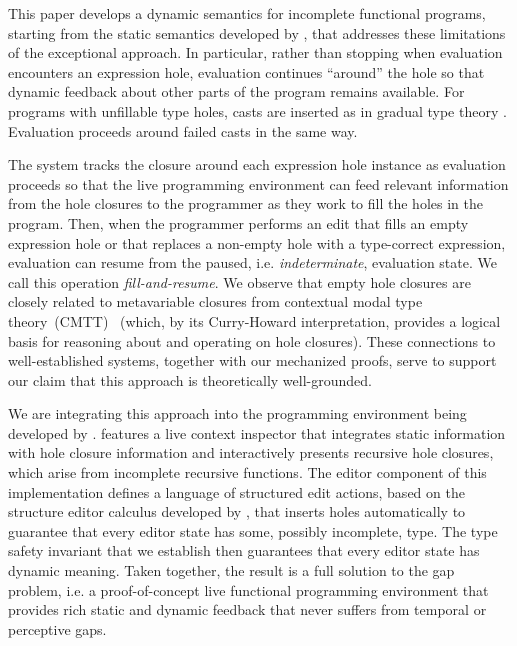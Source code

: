 
This paper develops a dynamic semantics for incomplete functional programs, starting from the static semantics developed by \citet{popl-paper},  that addresses these limitations of the exceptional approach. 
In particular, rather than stopping when evaluation encounters an expression hole, evaluation continues ``around'' the hole so that dynamic feedback about other parts of the program remains available. 
For programs with unfillable type holes, casts are inserted as in gradual type theory \cite{DBLP:conf/snapl/SiekVCB15}. Evaluation proceeds around failed casts in the same way. 

The system tracks the closure around each expression hole instance as evaluation proceeds so that 
the live programming environment can feed relevant information from the {hole closures} to the programmer as they work to fill the holes in the program.
Then, when the programmer performs an edit that fills an empty expression hole or that replaces a non-empty hole with a type-correct expression, evaluation can resume from the paused, i.e. \emph{indeterminate}, evaluation state. We call this operation \emph{fill-and-resume}. We observe that empty hole closures are closely related to metavariable closures from contextual modal type theory~(CMTT)~\cite{Nanevski2008} (which, by its Curry-Howard interpretation, provides a logical basis for reasoning about and operating on hole closures). These connections to well-established systems, together with our mechanized proofs, serve to support our claim that this approach is theoretically well-grounded.

We are integrating this approach into the \Hazel programming environment being developed by \citet{HazelnutSNAPL}. \Hazel features a live context inspector that integrates static information with hole closure information and interactively presents recursive hole closures, which arise from incomplete recursive functions. The editor component of this implementation defines a language of structured edit actions, 
based on the \Hazelnut structure editor calculus developed by \citet{popl-paper}, that inserts holes automatically to guarantee that
every editor state has some, possibly incomplete, type. 
The type safety invariant that we establish then guarantees that every editor state has dynamic meaning. Taken together, the result is a full solution to the gap problem, i.e. a proof-of-concept
live functional programming environment that provides rich static and dynamic feedback that never suffers from temporal or perceptive gaps.

